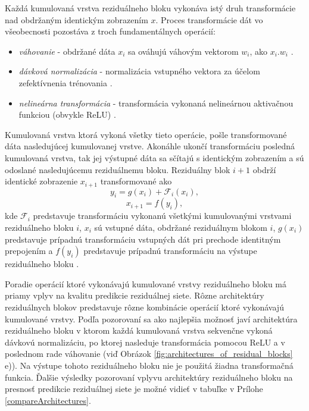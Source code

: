 Každá kumulovaná vrstva reziduálneho bloku vykonáva istý druh transformácie nad obdržaným identickým zobrazením $x$. Proces transformácie dát vo všeobecnosti pozostáva z troch fundamentálnych operácií:
\begin{itemize}
    \item \textit{váhovanie} - obdržané dáta $x_i$ sa ováhujú váhovým vektorom $w_i$, ako $x_i . w_i$ \cite{He2016, Goh1995}.
    \item \textit{dávková normalizácia} - normalizácia vstupného vektora za účelom zefektívnenia trénovania \cite{Ioffe2015, Goh1995}.
    \item \textit{nelineárna transformácia} - transformácia vykonaná nelineárnou aktivačnou funkciou (obvykle ReLU) \cite{Xu2015, Goh1995}.
\end{itemize}
Kumulovaná vrstva ktorá vykoná všetky tieto operácie, pošle transformované dáta nasledujúcej kumulovanej vrstve. Akonáhle ukončí transformáciu posledná kumulovaná vrstva, tak jej výstupné dáta sa sčítajú s identickým zobrazením a sú odoslané nasledujúcemu reziduálnemu bloku. Reziduálny blok $i+1$ obdrží identické zobrazenie $x_{i+1}$ transformované ako
\[y_i=g(x_i)+\mathcal{F}_i(x_i),\]
\[x_{i+1}=f(y_i),\]
kde $\mathcal{F}_i$ predstavuje transformáciu vykonanú všetkými kumulovanými vrstvami reziduálneho bloku $i$, $x_i$ sú vstupné dáta, obdržané reziduálnym blokom $i$, $g(x_i)$ predstavuje prípadnú transformáciu vstupných dát pri prechode identitným prepojením a $f(y_i)$ predstavuje prípadnú transformáciu na výstupe reziduálneho bloku \cite{Wu2017, He2016}.

Poradie operácií ktoré vykonávajú kumulované vrstvy reziduálneho bloku má priamy vplyv na kvalitu predikcie reziduálnej siete. Rôzne architektúry reziduálnych blokov predstavuje rôzne kombinácie operácií ktoré vykonávajú kumulované vrstvy. Podľa pozorovaní \cite{He2016} sa ako najlepšia možnosť javí architektúra reziduálneho bloku v ktorom každá kumulovaná vrstva sekvenčne vykoná dávkovú normalizáciu, po ktorej nasleduje transformácia pomocou ReLU a v poslednom rade váhovanie (viď Obrázok \ref{fig:architectures_of_residual_blocks} e)). Na výstupe tohoto reziduálneho bloku nie je použitá žiadna transformačná funkcia. Ďalšie výsledky pozorovaní vplyvu architektúry reziduálneho bloku na presnosť predikcie reziduálnej siete je možné vidieť v tabuľke v Prílohe \ref{compareArchitectures}.

